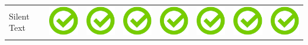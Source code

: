 \documentclass[10pt,foldmark,tumble]{leaflet}
\begin{document}
{{\begin{tabular}{ L{2cm} | C{2cm} | C{2cm} | C{2cm} | C{2cm} | C{2cm} | C{2cm} | C{2cm} | }
Silent Text & \includegraphics[scale=0.1]{pics/haken.png} & \includegraphics[scale=0.1]{pics/haken.png} & \includegraphics[scale=0.1]{pics/haken.png} & \includegraphics[scale=0.1]{pics/haken.png} & \includegraphics[scale=0.1]{pics/haken.png} & \includegraphics[scale=0.1]{pics/haken.png} & \includegraphics[scale=0.1]{pics/haken.png} \tabularnewline

\end{tabular}}}
\end{document}
